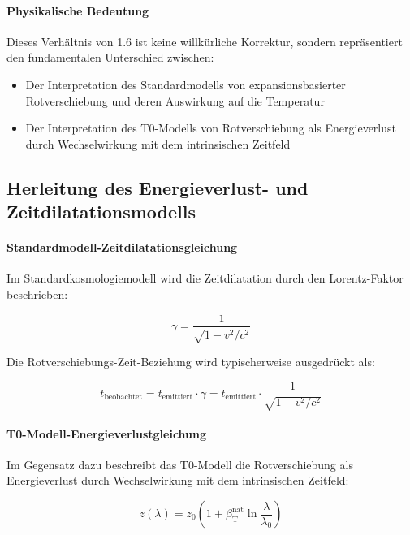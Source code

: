 \documentclass[12pt,a4paper]{article}
\newcommand{\betaT}{\beta_{\text{T}}}
\begin{document}
	\paragraph{Physikalische Bedeutung}
	Dieses Verhältnis von 1.6 ist keine willkürliche Korrektur, sondern repräsentiert den fundamentalen Unterschied zwischen:
	\begin{itemize}
		\item Der Interpretation des Standardmodells von expansionsbasierter Rotverschiebung und deren Auswirkung auf die Temperatur
		\item Der Interpretation des T0-Modells von Rotverschiebung als Energieverlust durch Wechselwirkung mit dem intrinsischen Zeitfeld
	\end{itemize}
	
	\subsection{Herleitung des Energieverlust- und Zeitdilatationsmodells}
	\label{subsec:energy_loss_time_dilation_derivation}
	
	\paragraph{Standardmodell-Zeitdilatationsgleichung}
	Im Standardkosmologiemodell wird die Zeitdilatation durch den Lorentz-Faktor beschrieben:
	
	\begin{equation}
		\gamma = \frac{1}{\sqrt{1 - v^2/c^2}}
	\end{equation}
	
	Die Rotverschiebungs-Zeit-Beziehung wird typischerweise ausgedrückt als:
	
	\begin{equation}
		t_{\text{beobachtet}} = t_{\text{emittiert}} \cdot \gamma = t_{\text{emittiert}} \cdot \frac{1}{\sqrt{1 - v^2/c^2}}
	\end{equation}
	
	\paragraph{T0-Modell-Energieverlustgleichung}
	Im Gegensatz dazu beschreibt das T0-Modell die Rotverschiebung als Energieverlust durch Wechselwirkung mit dem intrinsischen Zeitfeld:
	
	\begin{equation}
		z(\lambda) = z_0 \left(1 + \betaT^{\text{nat}} \ln\frac{\lambda}{\lambda_0}\right)
	\end{equation}
	
\end{document}
